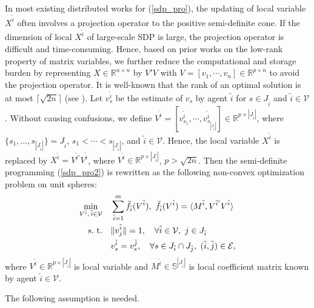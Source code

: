 \documentclass[journal]{IEEEtran}
\newcommand{\upcite}[1]{\textsuperscript{\textsuperscript{\cite{#1}}}}
\begin{document}
\par In most existing distributed works\upcite{ADMM_CDC,fast_dis} for (\ref{sdp_pro}), the updating of local variable $X^{\tilde{i}}$ often involves a projection operator to the positive semi-definite cone. If the dimension of local $X^{\tilde{i}}$ of large-scale SDP is large, the projection operator is difficult and time-consuming. Hence, based on prior works on the low-rank property of matrix variables, we further reduce the computational and storage burden by representing $X\in\mathbb R^{n\times n}$ by $V'V$ with $V=[v_1,\cdots, v_n]\in\mathbb R^{p\times n}$ to avoid the projection operator. It is well-known that the rank of an optimal solution is at most $\lceil\sqrt{2n}\rceil$ (see \cite{SDP_rank}). Let $v^{\tilde{i}}_s$ be the estimate of $v_s$ by agent $\tilde{i}$ for $s\in J_{\tilde{i}}$ and $\tilde{i}\in\mathcal V$. Without causing confusions, we define
$V^{\tilde{i}}=[v^{\tilde{i}}_{s_1},\cdots,v^{\tilde{i}}_{s_{|J_{\tilde{i}}|}}]\in\mathbb R^{p\times |J_{\tilde{i}}|}$, where  $\{s_1,\ldots,s_{|J_{\tilde{i}}|}\}= J_{\tilde{i}}$, $s_1<\cdots<s_{|J_{\tilde{i}}|}$, and $\tilde{i}\in\mathcal V$.
Hence, the local variable $X^{\tilde{i}}$ is replaced by $X^{\tilde{i}}=V^{\tilde{i}'}V^{\tilde{i}}$, where $V^{\tilde{i}}\in \mathbb{R}^{p\times \left|J_{\tilde{i}}\right|}$, $p>\sqrt{2n}$. Then the semi-definite programming (\ref{sdp_pro2}) is rewritten as the following non-convex optimization problem on unit spheres:
\begin{subequations}\label{non-convex_pro}
	\begin{align}
	\min_{V^{\tilde i},\,\tilde{i}\in\mathcal V} \quad & \sum_{\tilde{i}=1}^m \tilde f_{\tilde{i}}(V^{\tilde{i}}), \ \tilde  f_{\tilde{i}}(V^{\tilde{i}})=\langle M^{\tilde{i}} ,V^{\tilde{i}'}V^{\tilde{i}}\rangle \label{obj}\\
	{\rm s.} \ {\rm t.} \quad  &\|v_j^{\tilde{i}}\|=1, \quad \forall \tilde{i}\in\mathcal V, \ {j} \in J_{\tilde{i}}\label{norm_con}\\
	&v_{{s}}^{\tilde{i}}=v_{{s}}^{\tilde{j}}, \quad \forall {s} \in J_{\tilde{i}}\cap J_{\tilde{j}},\ (\tilde{i},\tilde{j})\in \mathcal{E},\label{share_con}
	\end{align}
\end{subequations}
where $V^{\tilde{i}}\in \mathbb{R}^{p \times \left|J_{\tilde{i}}\right|}$ is local variable and $M^{\tilde{i}}\in\mathbb{S}^{\left|J_{\tilde{i}}\right|}$ is local coefficient matrix known by agent $\tilde{i}\in\mathcal V$.
\par The following assumption is needed.
\end{document}
